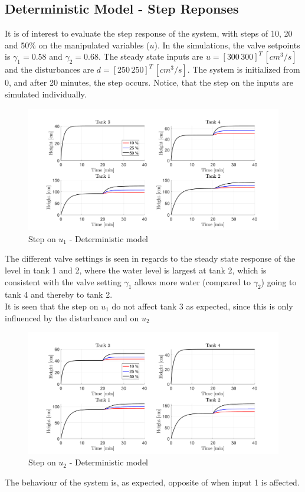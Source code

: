 \subsection{Deterministic Model - Step Reponses}
It is of interest to evaluate the step response of the system, with steps of 10, 20 and 50\% on the manipulated variables ($u$). In the simulations, the valve setpoints is $\gamma_1=0.58$ and $\gamma_2=0.68$. The steady state inputs are $u=[300\,300]^T\,[cm^3/s]$ and the disturbances are $d=[250\,250]^T\,[cm^3/s]$. The system is initialized from 0, and after 20 minutes, the step occurs. Notice, that the step on the inputs are simulated individually.
\begin{figure}[H]
    \centering
    \includegraphics[width=1\textwidth]{Figures/Pr3.1_Det_Step u1.png}
    \caption{Step on $u_1$ - Deterministic model}
\end{figure}
The different valve settings is seen in regards to the steady state response of the level in tank 1 and 2, where the water level is largest at tank 2, which is consistent with the valve setting $\gamma_1$ allows more water (compared to $\gamma_2$) going to tank 4 and thereby to tank 2.\\
It is seen that the step on $u_1$ do not affect tank 3 as expected, since this is only influenced by the disturbance and on $u_2$
\begin{figure}[H]
    \centering
    \includegraphics[width=1\textwidth]{Figures/Pr3.1_Det_Step u2.png}
    \caption{Step on $u_2$ - Deterministic model}
\end{figure}
The behaviour of the system is, as expected, opposite of when input 1 is affected. 